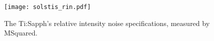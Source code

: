 \begin{figure}[H]
\centering
\texttt{[image: solstis\_rin.pdf]}
\caption{The Ti:Sapph's relative intensity noise specifications, measured by MSquared.}
\label{fig:solstis_rin}
\end{figure}
